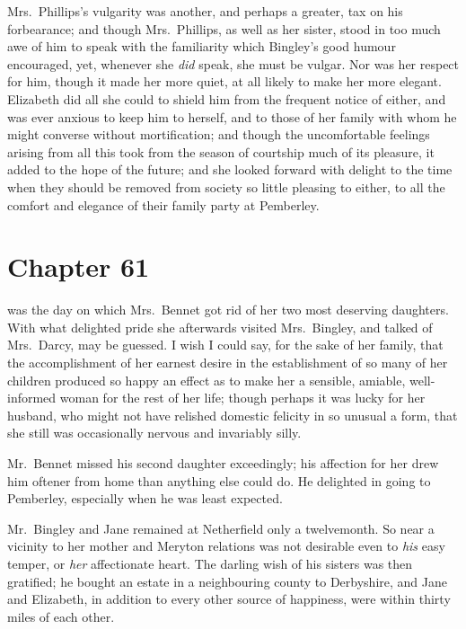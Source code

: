 Mrs.\ Phillips's vulgarity was another, and perhaps a greater,
tax on his forbearance; and though Mrs.\ Phillips, as well as
her sister, stood in too much awe of him to speak with the
familiarity which Bingley's good humour encouraged, yet,
whenever she \emph{did} speak, she must be vulgar.  Nor was her
respect for him, though it made her more quiet, at all likely
to make her more elegant.  Elizabeth did all she could to
shield him from the frequent notice of either, and was ever
anxious to keep him to herself, and to those of her family with
whom he might converse without mortification; and though the
uncomfortable feelings arising from all this took from the
season of courtship much of its pleasure, it added to the hope
of the future; and she looked forward with delight to the time
when they should be removed from society so little pleasing to
either, to all the comfort and elegance of their family party
at Pemberley.



\chapter{Chapter 61}


 was the day on which
Mrs.\ Bennet got rid of her two most deserving daughters.
With what delighted pride she afterwards visited Mrs.\ Bingley,
and talked of Mrs.\ Darcy, may be guessed.  I wish I could say,
for the sake of her family, that the accomplishment of her
earnest desire in the establishment of so many of her children
produced so happy an effect as to make her a sensible, amiable,
well-informed woman for the rest of her life; though perhaps it
was lucky for her husband, who might not have relished domestic
felicity in so unusual a form, that she still was occasionally
nervous and invariably silly.

Mr.\ Bennet missed his second daughter exceedingly; his
affection for her drew him oftener from home than anything
else could do.  He delighted in going to Pemberley, especially
when he was least expected.

Mr.\ Bingley and Jane remained at Netherfield only a twelvemonth.
So near a vicinity to her mother and Meryton relations was not
desirable even to \emph{his} easy temper, or \emph{her} affectionate heart.
The darling wish of his sisters was then gratified; he bought
an estate in a neighbouring county to Derbyshire, and Jane and
Elizabeth, in addition to every other source of happiness, were
within thirty miles of each other.

